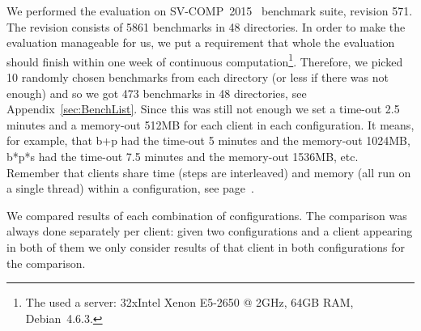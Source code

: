 \documentclass[envcountsame]{llncs}
\begin{document}
We performed the evaluation on SV-COMP~2015~\cite{SVCOMPURL} benchmark suite,
revision 571. The revision consists of 5861 benchmarks in 48 directories. In
order to make the evaluation manageable for us, we put a requirement that whole
the evaluation should finish within one week of continuous
computation\footnote{The used a server: 32xIntel Xenon E5-2650 @ 2GHz, 64GB RAM,
Debian~4.6.3.}. Therefore, we picked 10 randomly chosen benchmarks from each
directory (or less if there was not enough) and so we got 473 benchmarks in 48
directories, see Appendix~\ref{sec:BenchList}. Since this was still not enough
we set a time-out 2.5 minutes and a memory-out 512MB for each client in each
configuration. It means, for example, that b+p had the time-out 5 minutes and
the memory-out 1024MB, b*p*s had the time-out 7.5 minutes and the memory-out
1536MB, etc. Remember that clients share time (steps are interleaved) and memory
(all run on a single thread) within a configuration, see
page~\pageref{sec:CaseStudy}.



We compared results of each combination of configurations. The comparison was
always done separately per client: given two configurations and a client
appearing in both of them we only consider results of that client in both
configurations for the comparison.
\end{document}
